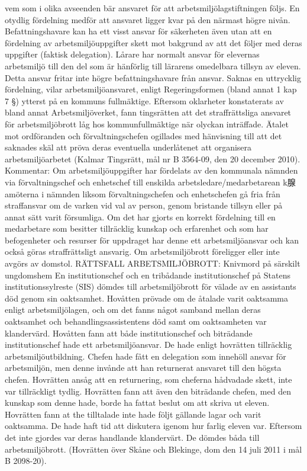 vem som i olika avseenden bär ansvaret för att arbetsmiljölagstiftningen följs. En otydlig fördelning medför att ansvaret ligger kvar på den närmast högre nivån. Befattningshavare kan ha ett visst ansvar för säkerheten även utan att en fördelning av arbetsmiljöuppgifter skett mot bakgrund av att det följer med deras uppgifter (faktisk delegation). Lårare har normalt ansvar för elevernas arbetsmiljö till den del som är hänförlig till lärarens omedelbara tillsyn av eleven. Detta ansvar fritar inte högre befattningshavare från ansvar.
Saknas en uttrycklig fördelning, vilar arbetsmiljöansvaret, enligt Regeringsformen (bland annat 1 kap 7 §) ytterst på en kommuns fullmäktige. Eftersom oklarheter konstaterats av bland annat Arbetsmiljöverket, fann tingsrätten att det straffrättsliga ansvaret för arbetsmiljöbrott låg hos kommunfullmäktige när olyckan inträffade. Ätalet mot ordföranden och förvaltningschefen ogillades med hänvisning till att det saknades skäl att pröva deras eventuella underlåtenet att organisera arbetsmiljöarbetet (Kalmar Tingsrätt, mål nr B 3564-09, den 20 december 2010).
Kommentar: Om arbetsmiljöuppgifter har fördelats av den kommunala nämnden via förvaltningschef och enhetschef till enskilda arbetsledare/medarbetarean k腺amöterna i nämnden liksom förvaltningschefen och enhetschefen gå fria från straffansvar om de varken vid val av person, genom bristande tillsyn eller på annat sätt varit försumliga. Om det har gjorts en korrekt fördelning till en medarbetare som besitter tillräcklig kunskap och erfarenhet och som har befogenheter och resurser för uppdraget har denne ett arbetsmiljöansvar och kan också göras straffrättsligt ansvarig. Om arbetsmiljöbrott föreligger eller inte avgörs av domstol.
RÄTTSFALL ARBETSMILJÖBROTT: Knivmord på särskilt ungdomshem En institutionschef och en tribådande institutionschef på Statens institutionssylreste (SIS) dömdes till arbetsmiljöbrott för välade av en assistants död genom sin oaktsamhet. Hovåtten prövade om de åtalade varit oaktsamma enligt arbetsmiljölagen, och om det fanns något samband mellan deras oaktsamhet och behandlingsassistentens död samt om oaktsamheten var klandervärd. Hovåtten fann att både institutionschef och biträdande institutionschef hade ett arbetsmiljöansvar. De hade enligt hovrätten tillräcklig arbetsmiljöutbildning. Chefen hade fått en delegation som innehöll ansvar för arbetsmiljön, men denne invånde att han returnerat ansvaret till den högsta chefen. Hovrätten ansåg att en returnering, som cheferna hådvadade skett, inte var tillräckligt tydlig. Hovrätten fann att även den biträdande chefen, med den kunskap som denne hade, borde ha fattat beslut om att skriva ut eleven. Hovrätten fann at the tilltalade inte hade följt gällande lagar och varit oaktsamma. De hade haft tid att diskutera igenom hur farlig eleven var. Eftersom det inte gjordes var deras handlande klandervärt. De dömdes båda till arbetsmiljöbrott. (Hovrätten över Skåne och Blekinge, dom den 14 juli 2011 i mål B 2098-20).

